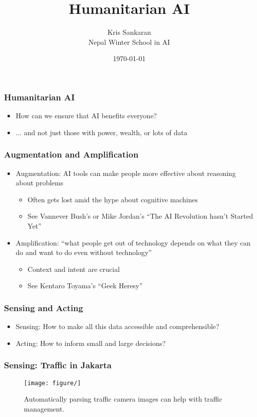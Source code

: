 \documentclass[10pt,mathserif]{beamer}
\title{\large \bfseries Humanitarian AI}
\author{Kris Sankaran\\[3ex] Nepal Winter School in AI}
\date{\today}
\begin{document}
\maketitle

\begin{frame}
  \frametitle{Humanitarian AI}
  \begin{itemize}
  \item How can we ensure that AI benefits everyone?
  \item ... and not just those with power, wealth, or lots of data
  \end{itemize} 
\end{frame}

\begin{frame}
  \frametitle{Augmentation and Amplification}
  \begin{itemize}
  \item Augmentation: AI tools can make people more effective about reasoning
    about problems
    \begin{itemize}
    \item Often gets lost amid the hype about cognitive machines
    \item See Vannever Bush's or Mike Jordan's ``The AI Revolution hasn't Started Yet''
    \end{itemize}
  \item Amplification: ``what people get out of technology depends on what they
    can do and want to do even without technology''
    \begin{itemize}
    \item Context and intent are crucial
    \item See Kentaro Toyama's ``Geek Heresy''
    \end{itemize}
  \end{itemize} 
\end{frame}

\begin{frame}
  \frametitle{Sensing and Acting}
  \begin{itemize}
  \item Sensing: How to make all this data accessible and comprehensible?
  \item Acting: How to inform small and large decisions?
  \end{itemize} 
\end{frame}

\begin{frame}
  \frametitle{Sensing: Traffic in Jakarta}
  \begin{figure}[ht]
    \centering
    \texttt{[image: figure/]}
    \caption{Automatically parsing traffic camera images can help with traffic
      management. \label{fig:label} }
  \end{figure}
\end{frame}
\end{document}
